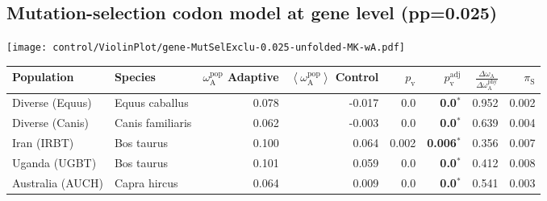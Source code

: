 \subsection{Mutation-selection codon model at gene level (pp=0.025)}
\begin{center}
\texttt{[image: control/ViolinPlot/gene-MutSelExclu-0.025-unfolded-MK-wA.pdf]} 
\begin{adjustbox}{width = 1\textwidth}
\begin{tabular}{|l|l|r|r|r|r|r|r|}
\toprule
                     Population &              Species & \specialcell{$\omega_{\mathrm{A}}^{\mathrm{pop}}$ \\ Adaptive} & \specialcell{$\left< \omega_{\mathrm{A}}^{\mathrm{pop}} \right>$ \\ Control} & $p_{\mathrm{v}}$ & $p_{\mathrm{v}}^{\mathrm{adj}}$ & $\frac{\Delta\omega_{\mathrm{A}}}{\Delta\omega_{\mathrm{A}}^{\mathrm{phy}}}$ & $\pi_{\textrm{S}}$ \\
\midrule
                Diverse (Equus) &       Equus caballus &                                              0.078 &                                             -0.017 &              0.0 &                    \textbf{0.0}$\bm{^*}$ &                                              0.952 &              0.002 \\
                Diverse (Canis) &     Canis familiaris &                                              0.062 &                                             -0.003 &              0.0 &                    \textbf{0.0}$\bm{^*}$ &                                              0.639 &              0.004 \\
                    Iran (IRBT) &           Bos taurus &                                              0.100 &                                              0.064 &            0.002 &                  \textbf{0.006}$\bm{^*}$ &                                              0.356 &              0.007 \\
                  Uganda (UGBT) &           Bos taurus &                                              0.101 &                                              0.059 &              0.0 &                    \textbf{0.0}$\bm{^*}$ &                                              0.412 &              0.008 \\
               Australia (AUCH) &         Capra hircus &                                              0.064 &                                              0.009 &              0.0 &                    \textbf{0.0}$\bm{^*}$ &                                              0.541 &              0.003 \\

\end{tabular}
\end{adjustbox}
\end{center}
